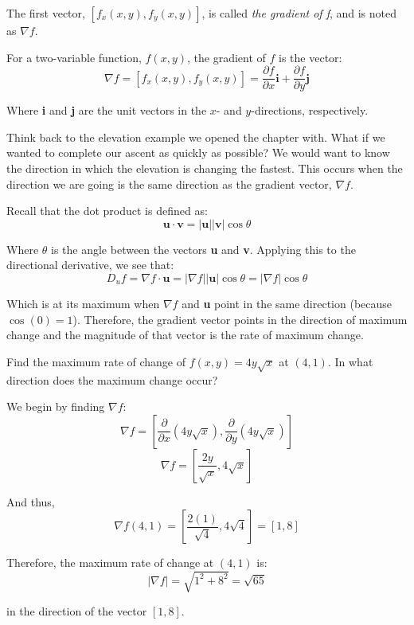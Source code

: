 The first vector, $\left[ f_x(x, y), f_y(x, y) \right]$, is called \textit{the 
gradient of f}, and is noted as $\nabla f$. 

\begin{mdframed}[style = important, frametitle = {The Gradient}]
For a two-variable function, $f(x, y)$, the gradient of $f$ is the vector:
$$\nabla f = \left[ f_x(x, y), f_y(x, y) \right] = \frac{\partial f}{\partial 
x} \textbf{i} + \frac{\partial f}{\partial y} \textbf{j}$$

Where \textbf{i} and \textbf{j} are the unit vectors in the $x$- and 
$y$-directions, respectively.
\end{mdframed}

Think back to the elevation example we opened the chapter with. What if we 
wanted to complete our ascent as quickly as possible? We would want to 
know the direction in which the elevation is changing the fastest. This occurs 
when the direction we are going is the same direction as the gradient vector, 
$\nabla f$. 

Recall that the dot product is defined as:
$$\textbf{u} \cdot \textbf{v} = \left| \textbf{u} \right| \left| \textbf{v} 
\right| \cos{ \theta}$$

Where $\theta$ is the angle between the vectors \textbf{u} and \textbf{v}. 
Applying this to the directional derivative, we see that:
$$D_u f = \nabla f \cdot \textbf{u} = \left| \nabla f \right| \left| 
\textbf{u} \right| \cos{\theta} = \left| \nabla f \right| \cos{\theta}$$

Which is at its maximum when $\nabla f$ and \textbf{u} point in the same 
direction (because $\cos{\left( 0 \right)} = 1$). Therefore, the gradient 
vector points in the direction of maximum change and the magnitude of that 
vector is the rate of maximum change. 

\begin{Worked}
\begin{Problem}
Find the maximum rate of change of $f(x, y) = 4y\sqrt{x}$ at 
$(4, 1)$. In what direction does the maximum change occur?
\end{Problem}
\begin{Solution}
We begin by finding $\nabla f$:
$$\nabla f = \left[ \frac{\partial}{\partial x} \left( 4y\sqrt{x} \right), 
\frac{\partial}{\partial y} \left( 4y\sqrt{x} \right) \right]$$
$$\nabla f = \left[ \frac{2y}{\sqrt{x}}, 4\sqrt{x} \right]$$

And thus, 
$$\nabla f(4, 1) = \left[ \frac{2(1)}{\sqrt{4}}, 4\sqrt{4} \right] = \left[ 1, 
8 \right]$$

Therefore, the maximum rate of change at $(4, 1)$ is:
$$\left| \nabla f \right| = \sqrt{1^2 + 8^2} = \sqrt{65}$$

in the direction of the vector $\left[ 1, 8 \right]$. 
\end{Solution}
\end{Worked}

